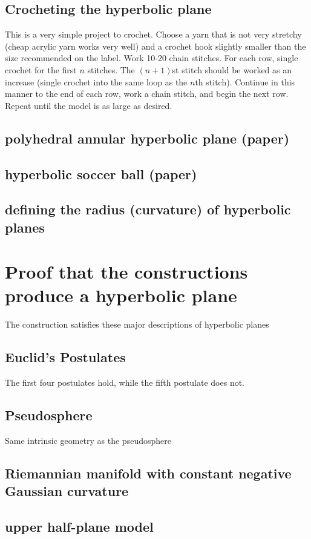\documentclass[letterpaper,titlepage]{article}
\begin{document}
\subsection{Crocheting the hyperbolic plane}
This is a very simple project to crochet.
Choose a yarn that is not very stretchy (cheap acrylic yarn works very well) and a crochet hook slightly smaller than the size recommended on the label.
Work 10-20 chain stitches.
For each row, single crochet for the first $n$ stitches.
The $(n+1)$st stitch should be worked as an increase (single crochet into the same loop as the $n$th stitch).
Continue in this manner to the end of each row, work a chain stitch, and begin the next row.
Repeat until the model is as large as desired.\cite{crochetplane}
\subsection{polyhedral annular hyperbolic plane (paper)}
\subsection{hyperbolic soccer ball (paper)}
\subsection{defining the radius (curvature) of hyperbolic planes}

\section{Proof that the constructions produce a hyperbolic plane}
The construction satisfies these major descriptions of hyperbolic planes
\subsection{Euclid's Postulates}
The first four postulates hold, while the fifth postulate does not.
\subsection{Pseudosphere}
Same intrinsic geometry as the pseudosphere
\subsection{Riemannian manifold with constant negative Gaussian curvature}
\subsection{upper half-plane model}
\end{document}
